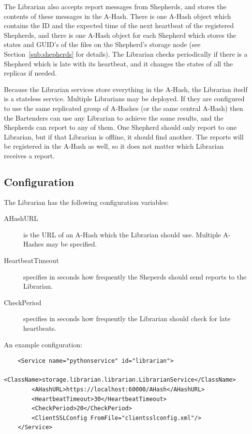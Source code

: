 \documentclass{book}
\begin{document}
The Librarian also accepts report messages from Shepherds, and stores the contents of these messages in the A-Hash. There is one A-Hash object which contains the ID and the expected time of the next heartbeat of the registered Shepherds, and there is one A-Hash object for each Shepherd which stores the states and GUID's of the files on the Shepherd's storage node (see Section~\ref{sub:shepherds} for details). The Librarian checks periodically if there is a Shepherd which is late with its heartbeat, and it changes the states of all the replicas if needed.

Because the Librarian services store everything in the A-Hash, the Librarian itself is a stateless service. Multiple Librarians may be deployed. If they are configured to use the same replicated group of A-Hashes (or the same central A-Hash) then the Bartenders can use any Librarian to achieve the same results, and the Shepherds can report to any of them. One Shepherd should only report to one Librarian, but if that Librarian is offline, it should find another. The reports will be registered in the A-Hash as well, so it does not matter which Librarian receives a report.


\subsection{Configuration} %

The Librarian has the following configuration variables:

\begin{description}
    \item[AHashURL] is the URL of an A-Hash which the Librarian should use. Multiple A-Hashes may be specified.
    \item[HeartbeatTimeout] specifies in seconds how frequently the Sheperds should send reports to the Librarian.
    \item[CheckPeriod] specifies in seconds how frequently the Librarian should check for late heartbeats.
\end{description}

An example configuration:

\begin{verbatim}
    <Service name="pythonservice" id="librarian">
        <ClassName>storage.librarian.librarian.LibrarianService</ClassName>
        <AHashURL>https://localhost:60000/AHash</AHashURL>
        <HeartbeatTimeout>30</HeartbeatTimeout>
        <CheckPeriod>20</CheckPeriod>
        <ClientSSLConfig FromFile="clientsslconfig.xml"/>
    </Service>
\end{verbatim}
\end{document}
